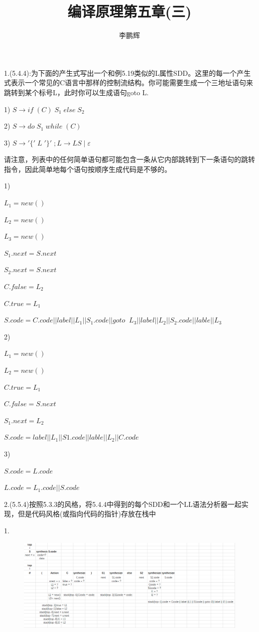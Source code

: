 \documentclass[a4paper, 10pt]{article}
\title{编译原理第五章(三)}
\author{李鹏辉}
\begin{document}
\maketitle 

1.(5.4.4):为下面的产生式写出一个和例5.19类似的L属性SDD。这里的每一个产生式表示一个常见的C语言中那样的控制流结构。你可能需要生成一个三地址语句来跳转到某个标号L，此时你可以生成语句goto L.

1) $S\rightarrow if \;(C)\;S_1 \; else \; S_2$

2) $S\rightarrow do \; S_1 \; while\; (C)$

3) $S\rightarrow '\{'  \;L \;'\}' \;; L \rightarrow LS \;| \;\varepsilon$

请注意，列表中的任何简单语句都可能包含一条从它内部跳转到下一条语句的跳转指令，因此简单地每个语句按顺序生成代码是不够的。

1)

$L_1 = new()$

$L_2 = new()$

$L_3 = new()$

$S_1.next = S.next$

$S_2.next = S.next$

$C.false = L_2$

$C.true = L_1$

$S.code = C.code||label||L_1 ||S_1.code||goto\;\; L_3 || label || L_2 || S_2.code || lable || L_3$


2)

$L_1 = new()$

$L_2 = new()$

$C.true = L_1$

$C.false = S.next$

$S_1.next = L_2$

$S.code =  label||L_1 || S1.code ||lable||L_2|| C.code$

3)

$S.code = L.code$

$L.code = L_1.code || S.code$


2.(5.5.4)按照5.3.3的风格，将5.4.4中得到的每个SDD和一个LL语法分析器一起实现，但是代码风格(或指向代码的指针)存放在栈中

1. 
\begin{figure}[H]
\centering
\includegraphics[scale=0.6]{chapter5_hw3_1}
\end{figure}
\end{document}
